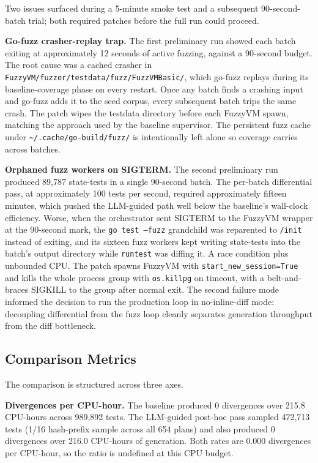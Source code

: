 \documentclass[conference]{IEEEtran}
\begin{document}
Two issues surfaced during a 5-minute smoke test and a subsequent 90-second-batch trial; both required patches before the full run could proceed.

\textbf{Go-fuzz crasher-replay trap.} The first preliminary run showed each batch exiting at approximately 12 seconds of active fuzzing, against a 90-second budget. The root cause was a cached crasher in \texttt{FuzzyVM/fuzzer/testdata/fuzz/FuzzVMBasic/}, which go-fuzz replays during its baseline-coverage phase on every restart. Once any batch finds a crashing input and go-fuzz adds it to the seed corpus, every subsequent batch trips the same crash. The patch wipes the testdata directory before each FuzzyVM spawn, matching the approach used by the baseline supervisor. The persistent fuzz cache under \texttt{\textasciitilde/.cache/go-build/fuzz/} is intentionally left alone so coverage carries across batches.

\textbf{Orphaned fuzz workers on SIGTERM.} The second preliminary run produced 89,787 state-tests in a single 90-second batch. The per-batch differential pass, at approximately 100 tests per second, required approximately fifteen minutes, which pushed the LLM-guided path well below the baseline's wall-clock efficiency. Worse, when the orchestrator sent SIGTERM to the FuzzyVM wrapper at the 90-second mark, the \texttt{go test --fuzz} grandchild was reparented to \texttt{/init} instead of exiting, and its sixteen fuzz workers kept writing state-tests into the batch's output directory while \texttt{runtest} was diffing it. A race condition plus unbounded CPU. The patch spawns FuzzyVM with \texttt{start\_new\_session=True} and kills the whole process group with \texttt{os.killpg} on timeout, with a belt-and-braces SIGKILL to the group after normal exit. The second failure mode informed the decision to run the production loop in no-inline-diff mode: decoupling differential from the fuzz loop cleanly separates generation throughput from the diff bottleneck.

\subsection{Comparison Metrics}

The comparison is structured across three axes.

\textbf{Divergences per CPU-hour.} The baseline produced 0 divergences over 215.8 CPU-hours across 989{,}892 tests. The LLM-guided post-hoc pass sampled 472{,}713 tests (1/16 hash-prefix sample across all 654 plans) and also produced 0 divergences over 216.0 CPU-hours of generation. Both rates are 0.000 divergences per CPU-hour, so the ratio is undefined at this CPU budget.
\end{document}
